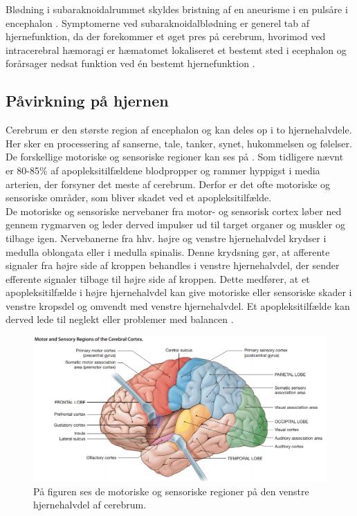 Blødning i subaraknoidalrummet skyldes bristning af en aneurisme i en pulsåre i encephalon \cite{Schulze2011}. Symptomerne ved subaraknoidalblødning er generel tab af hjernefunktion, da der forekommer et øget pres på cerebrum, hvorimod ved intracerebral hæmoragi er hæmatomet lokaliseret et bestemt sted i ecephalon og forårsager nedsat funktion ved én bestemt hjernefunktion \cite{Caplan2006}. 

\subsection{Påvirkning på hjernen}
Cerebrum er den største region af encephalon og kan deles op i to hjernehalvdele. Her sker en processering af sanserne, tale, tanker, synet, hukommelsen og følelser. \cite{Martini2012} De forskellige motoriske og sensoriske regioner kan ses på . Som tidligere nævnt er 80-85\% af apopleksitilfældene blodpropper og rammer hyppigst i media arterien, der forsyner det meste af cerebrum. Derfor er det ofte motoriske og sensoriske områder, som bliver skadet ved et apopleksitilfælde. \cite{Sundhed.dk,Gade2004,Boss2010} \\
De motoriske og sensoriske nervebaner fra motor- og sensorisk cortex løber ned gennem rygmarven og leder derved impulser ud til target organer og muskler og tilbage igen. Nervebanerne fra hhv. højre og venstre hjernehalvdel krydser i medulla oblongata eller i medulla spinalis. Denne krydsning gør, at afferente signaler fra højre side af kroppen behandles i venstre hjernehalvdel, der sender efferente signaler tilbage til højre side af kroppen. \cite{Martini2012,Stanfield2014} Dette medfører, at et apopleksitilfælde i højre hjernehalvdel kan give motoriske eller sensoriske skader i venstre kropsdel og omvendt med venstre hjernehalvdel. Et apopleksitilfælde kan derved lede til neglekt eller problemer med balancen \cite{Sundhedsstyrelsen2009,Nichols1997}.

\begin{figure}[H]
	\centering
	\includegraphics[scale=0.6]{figures/bProblemanalyse/Encephalon.png}
	\caption{På figuren ses de motoriske og sensoriske regioner på den venstre hjernehalvdel af cerebrum. \cite{Martini2012}}
	\label{Enc}
\end{figure}

